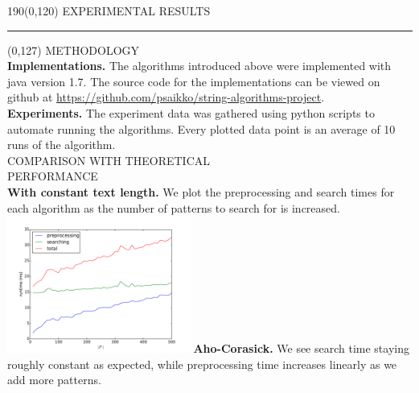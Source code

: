 \documentclass[a4paper]{article} %
\begin{document}
  
  \begin{textblock}{190}(0,120)
    \sffamily
    \Large{\color{sciorange}EXPERIMENTAL RESULTS}\small\\
    \rule[3mm]{190mm}{0.1pt}
  \end{textblock} 

  \begin{textblock}{60}(0,127)
    {\sffamily\normalsize{\color{sciorange}METHODOLOGY}}\vspace{1mm}\\
    \footnotesize
      \textbf{Implementations.} The algorithms introduced above were implemented with java version 1.7. The source code for the implementations can be viewed on github at \url{https://github.com/psaikko/string-algorithms-project}.
      \vspace{1mm}\\
      \textbf{Experiments.} The experiment data was gathered using python scripts to automate running the algorithms. Every plotted data point is an average of 10 runs of the algorithm.
      \vspace{2mm}\\
    {\sffamily\normalsize{\color{sciorange}COMPARISON WITH THEORETICAL\\PERFORMANCE}}\vspace{1mm}\\
    \footnotesize 
      \textbf{With constant text length.} We plot the preprocessing and search times for each algorithm as the number of patterns to search for is increased.\\
      \includegraphics[width=60mm]{patterncount_Aho-Corasick.pdf}
      \textbf{Aho-Corasick.} We see search time staying roughly constant as expected, while preprocessing time increases linearly as we add more patterns.
  \end{textblock} 
\end{document}
